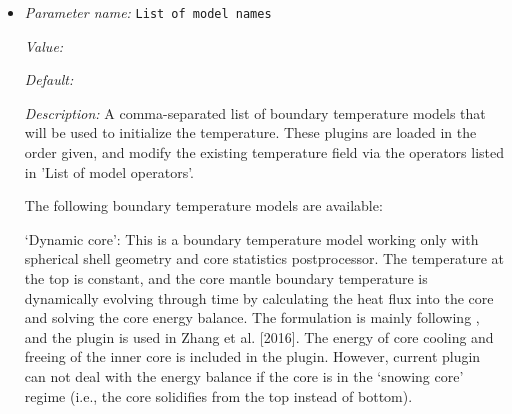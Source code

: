 \begin{itemize}
{\it Value:} 


{\it Default:} 


{\it Description:} A comma separated list of names denoting those boundaries on which the temperature is fixed and described by the boundary temperature object selected in the 'List of model names' parameter. All boundary indicators used by the geometry but not explicitly listed here will end up with no-flux (insulating) boundary conditions, or, if they are listed in the 'Fixed heat flux boundary indicators', with Neumann boundary conditions.

The names of the boundaries listed here can either be numbers (in which case they correspond to the numerical boundary indicators assigned by the geometry object), or they can correspond to any of the symbolic names the geometry object may have provided for each part of the boundary. You may want to compare this with the documentation of the geometry model you use in your model.

This parameter only describes which boundaries have a fixed temperature, but not what temperature should hold on these boundaries. The latter piece of information needs to be implemented in a plugin in the BoundaryTemperature group, unless an existing implementation in this group already provides what you want.


{\it Possible values:} A list of 0 to 4294967295 elements where each element is [Any string]
\item {\it Parameter name:} {\tt List of model names}
\label{parameters:Boundary temperature model/List of model names}
\label{parameters:Boundary_20temperature_20model/List_20of_20model_20names}


{\it Value:} 


{\it Default:} 


{\it Description:} A comma-separated list of boundary temperature models that will be used to initialize the temperature. These plugins are loaded in the order given, and modify the existing temperature field via the operators listed in 'List of model operators'.

The following boundary temperature models are available:

`Dynamic core': This is a boundary temperature model working only with spherical shell geometry and core statistics postprocessor. The temperature at the top is constant, and the core mantle boundary temperature is dynamically evolving through time by calculating the heat flux into the core and solving the core energy balance. The formulation is mainly following \cite{NPB+04}, and the plugin is used in Zhang et al. [2016]. The energy of core cooling and freeing of the inner core is included in the plugin. However, current plugin can not deal with the energy balance if the core is in the `snowing core' regime (i.e., the core solidifies from the top instead of bottom).


\end{itemize}
